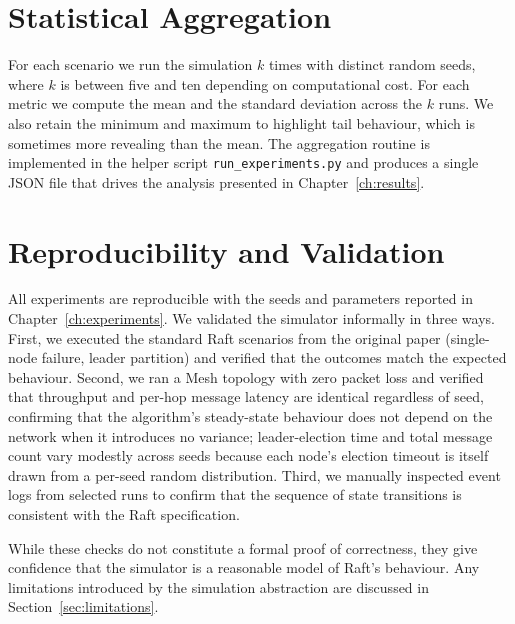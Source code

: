 \section{Statistical Aggregation}

For each scenario we run the simulation $k$ times with distinct random seeds, where $k$ is between five and ten depending on computational cost. For each metric we compute the mean and the standard deviation across the $k$ runs. We also retain the minimum and maximum to highlight tail behaviour, which is sometimes more revealing than the mean. The aggregation routine is implemented in the helper script \texttt{run\_experiments.py} and produces a single JSON file that drives the analysis presented in Chapter~\ref{ch:results}.

\section{Reproducibility and Validation}

All experiments are reproducible with the seeds and parameters reported in Chapter~\ref{ch:experiments}. We validated the simulator informally in three ways. First, we executed the standard Raft scenarios from the original paper (single-node failure, leader partition) and verified that the outcomes match the expected behaviour. Second, we ran a Mesh topology with zero packet loss and verified that throughput and per-hop message latency are identical regardless of seed, confirming that the algorithm's steady-state behaviour does not depend on the network when it introduces no variance; leader-election time and total message count vary modestly across seeds because each node's election timeout is itself drawn from a per-seed random distribution. Third, we manually inspected event logs from selected runs to confirm that the sequence of state transitions is consistent with the Raft specification.

While these checks do not constitute a formal proof of correctness, they give confidence that the simulator is a reasonable model of Raft's behaviour. Any limitations introduced by the simulation abstraction are discussed in Section~\ref{sec:limitations}.

